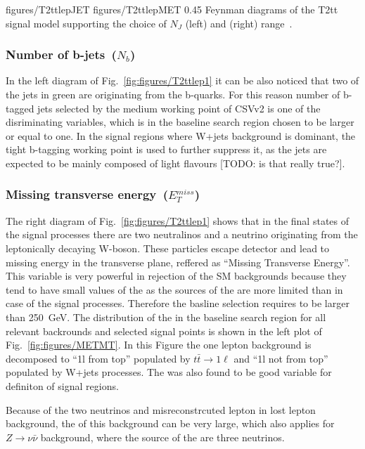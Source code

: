                  {figures/T2ttlepJET} %
                 {figures/T2ttlepMET} %
                 {0.45}       %
                 { Feynman diagrams of the T2tt signal model supporting the choice of $N_{J}$ (left) and \MET (right) range~\cite{CMS:2016vew}. }

\subsubsection{Number of b-jets~($N_{b}$)}

In the left diagram of Fig.~\ref{fig:figures/T2ttlep1} it can be also noticed that two of the jets in green are originating from the b-quarks. For this reason number of b-tagged jets selected by the medium working point of CSVv2 is one of the disriminating variables, which is in the baseline search region  chosen to be larger or equal to one. In the signal regions where W+jets background is dominant, the tight b-tagging working point is used to further suppress it, as the jets are expected to be mainly composed of light flavours [TODO: is that really true?].

\subsubsection{Missing transverse energy~($E_{T}^{miss}$)}

The right diagram of Fig.~\ref{fig:figures/T2ttlep1} shows that in the final states of the signal processes there are two neutralinos and a neutrino originating from the leptonically decaying W-boson. These particles escape detector and lead to missing energy in the transverse plane, reffered as ``Missing Transverse Energy''. This variable is very powerful in rejection of the SM backgrounds because they tend to have small values of the \MET as the sources of the \MET are more limited than in case of the signal processes. Therefore the basline selection requires \MET to be larger than 250~GeV. The distribution of the \MET in the baseline search region for all relevant backrounds and selected signal points is shown in the left plot of Fig.~\ref{fig:figures/METMT}. In this Figure the one lepton background is decomposed to ``1l from top'' populated by $t \bar{t} \to 1\ell$ and ``1l not from top'' populated by W+jets processes. The \MET was also found to be good variable for definiton of signal regions.

Because of the two neutrinos and misreconstrcuted lepton in lost lepton background, the \MET of this background can be very large, which also applies for $Z \to \nu \bar{\nu}$ background, where the source of the \MET are three neutrinos.

